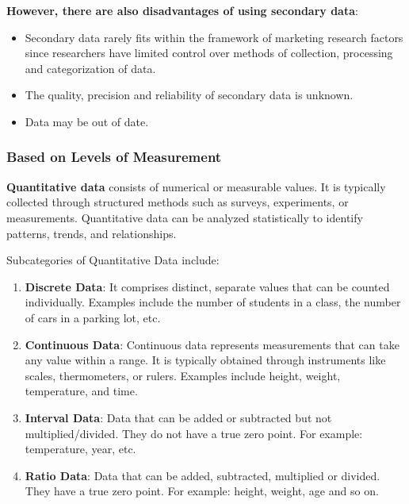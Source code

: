 \documentclass{article}
\begin{document}
            \noindent \textbf{However, there are also disadvantages of using secondary data}:
            \begin{itemize}
                \item Secondary data rarely fits within the framework of marketing research factors since researchers have limited control over methods of collection, processing and categorization of data.
                \item The quality, precision and reliability of secondary data is unknown.
                \item Data may be out of date.
            \end{itemize}

            
            \subsubsection{Based on Levels of Measurement}

            \textbf{Quantitative data} consists of numerical or measurable values. It is typically collected through structured methods such as surveys, experiments, or measurements. Quantitative data can be analyzed statistically to identify patterns, trends, and relationships. \cite{statistics_nutshell}
            \bigskip
            
            \noindent Subcategories of Quantitative Data include:
            \begin{enumerate}
                \item \textbf{Discrete Data}: It comprises distinct, separate values that can be counted individually. Examples include the number of students in a class, the number of cars in a parking lot, etc.
        
                \item \textbf{Continuous Data}: Continuous data represents measurements that can take any value within a range. It is typically obtained through instruments like scales, thermometers, or rulers. Examples include height, weight, temperature, and time.
        
                \item \textbf{Interval Data}: Data that can be added or subtracted but not multiplied/divided. They do not have a true zero point. For example: temperature, year, etc.
                
                \item \textbf{Ratio Data}: Data that can be added, subtracted, multiplied or divided. They have a true zero point. For example: height, weight, age and so on.
            \end{enumerate}
\end{document}
